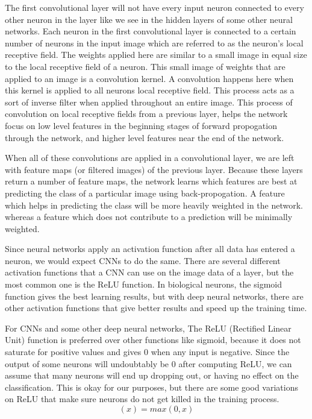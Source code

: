 \documentclass[12pt]{report} %
\begin{document}
	The first convolutional layer will not have every input neuron connected to every other neuron in the layer like we see in the hidden layers of some other neural networks. Each neuron in the first convolutional layer is connected to a certain number of neurons in the input image which are referred to as the neuron's local receptive field. The weights applied here are similar to a small image in equal size to the local receptive field of a neuron. This small image of weights that are applied to an image is a convolution kernel. A convolution happens here when this kernel is applied to all neurons local receptive field. This process acts as a sort of inverse filter when applied throughout an entire image. This process of convolution on local receptive fields from a previous layer, helps the network focus on low level features in the beginning stages of forward propogation through the network, and higher level features near the end of the network.\cite{aurelienMachineLearning} 
	
	When all of these convolutions are applied in a convolutional layer, we are left with feature maps (or filtered images) of the previous layer. Because these layers return a number of feature maps, the network learns which features are best at predicting the class of a particular image using back-propogation. A feature which helps in predicting the class will be more heavily weighted in the network. whereas a feature which does not contribute to a prediction will be minimally weighted.
	
	Since neural networks apply an activation function after all data has entered a neuron, we would expect CNNs to do the same. There are several different activation functions that a CNN can use on the image data of a layer, but the most common one is the ReLU function. In biological neurons, the sigmoid function gives the best learning results, but with deep neural networks, there are other activation functions that give better results and speed up the training time.\cite{krizhevsky2012imagenet} 
	
	For CNNs and some other deep neural networks, The ReLU (Rectified Linear Unit) function is preferred over other functions like sigmoid, because it does not saturate for positive values and gives 0 when any input is negative. Since the output of some neurons will undoubtably be 0 after computing ReLU, we can assume that many neurons will end up dropping out, or having no effect on the classification. This is okay for our purposes, but there are some good variations on ReLU that make sure neurons do not get killed in the training process. \cite{aurelienMachineLearning} 
 \begin{equation}	
 (x) = max(0, x)%
 \end{equation}
 
\end{document}
